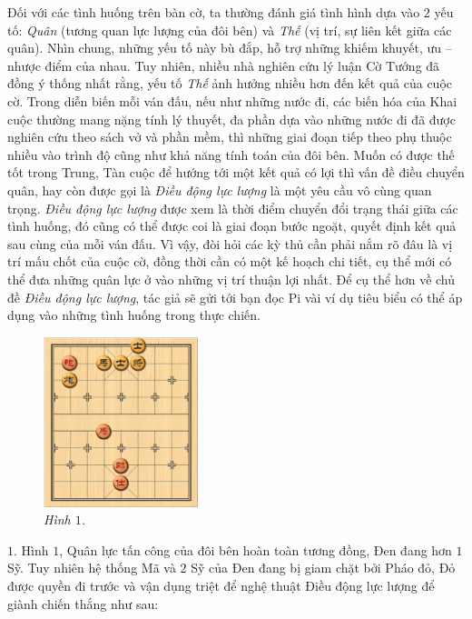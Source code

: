 \vspace*{185pt}
\begin{multicols}{2}	
	Đối với các tình huống trên bàn cờ, ta thường đánh giá tình hình dựa vào $2$ yếu tố: \textit{Quân} (tương quan lực lượng của đôi bên) và \textit{Thế} (vị trí, sự liên kết giữa các quân). Nhìn chung, những yếu tố này bù đắp, hỗ trợ những khiếm khuyết, ưu -- nhược điểm của nhau. Tuy nhiên, nhiều nhà nghiên cứu lý luận Cờ Tướng đã đồng ý thống nhất rằng, yếu tố \textit{Thế} ảnh hưởng nhiều hơn đến kết quả của cuộc cờ. Trong diễn biến mỗi ván đấu, nếu như những nước đi, các biến hóa của Khai cuộc thường mang nặng tính lý thuyết, đa phần dựa vào những nước đi đã được nghiên cứu theo sách vở và phần mềm, thì những giai đoạn tiếp theo phụ thuộc nhiều vào trình độ cũng như khả năng tính toán của đôi bên. Muốn có được thế tốt trong Trung, Tàn cuộc để hướng tới một kết quả có lợi thì vấn đề điều chuyển quân, hay còn được gọi là \textit{Điều động lực lượng} là một yêu cầu vô cùng quan trọng.
	\vskip 0.1cm
	\textit{Điều động lực lượng} được xem là thời điểm chuyển đổi trạng thái giữa các tình  huống, đó cũng có thể được coi là giai đoạn bước ngoặt, quyết định kết quả sau cùng của mỗi ván đấu. Vì vậy, đòi hỏi các kỳ thủ cần phải nắm rõ đâu là vị trí mấu chốt của cuộc cờ, đồng thời cần có một kế hoạch chi tiết, cụ thể mới có thể đưa những quân lực ở vào những vị trí thuận lợi nhất. 
	\vskip 0.1cm
	Để cụ thể hơn về chủ đề \textit{Điều động lực lượng}, tác giả sẽ gửi tới bạn đọc Pi vài ví dụ tiêu biểu có thể áp dụng vào những tình huống trong thực chiến.
	\begin{figure}[H]
		\vspace*{-5pt}
		\centering
		\captionsetup{labelformat= empty, justification=centering}
		\includegraphics[width= 0.4\textwidth]{1}
		\caption{\small\textit{\color{gocco}Hình $1$.}}
		\vspace*{-10pt}
	\end{figure}
	$1.$ Hình $1$, Quân lực tấn công của đôi bên hoàn toàn tương đồng, Đen đang hơn $1$ Sỹ. Tuy nhiên hệ thống Mã và $2$ Sỹ của Đen đang bị giam chặt bởi Pháo đỏ, Đỏ được quyền đi trước và vận dụng triệt để nghệ thuật Điều động lực lượng để giành chiến thắng như sau:

\end{multicols}
